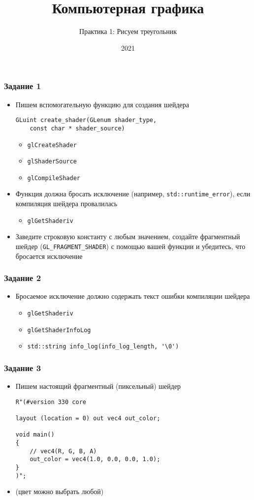 \documentclass{beamer}
\title{Компьютерная графика}
\subtitle{Практика 1: Рисуем треугольник}
\date{2021}
\begin{document}
\frame{\titlepage}

\begin{frame}[fragile]
\frametitle{Задание 1}
\begin{itemize}
\item Пишем вспомогательную функцию для создания шейдера
\begin{verbatim}
GLuint create_shader(GLenum shader_type,
    const char * shader_source)
\end{verbatim}
\pause
\begin{itemize}
\item \verb|glCreateShader|
\item \verb|glShaderSource|
\item \verb|glCompileShader|
\end{itemize}
\pause
\item Функция должна бросать исключение (например, \verb|std::runtime_error|), если компиляция шейдера провалилась
\begin{itemize}
\item \verb|glGetShaderiv|
\end{itemize}
\pause
\item Заведите строковую константу с любым значением, создайте фрагментный шейдер (\verb|GL_FRAGMENT_SHADER|) с помощью вашей функции и убедитесь, что бросается исключение
\end{itemize}
\end{frame}

\begin{frame}[fragile]
\frametitle{Задание 2}
\begin{itemize}
\item Бросаемое исключение должно содержать текст ошибки компиляции шейдера
\pause
\begin{itemize}
\item \verb|glGetShaderiv|
\item \verb|glGetShaderInfoLog|
\item \verb|std::string info_log(info_log_length, '\0')|
\end{itemize}
\end{itemize}
\end{frame}

\begin{frame}[fragile]
\frametitle{Задание 3}
\begin{itemize}
\item Пишем настоящий фрагментный (пиксельный) шейдер
\pause
\begin{verbatim}
R"(#version 330 core

layout (location = 0) out vec4 out_color;

void main()
{
    // vec4(R, G, B, A)
    out_color = vec4(1.0, 0.0, 0.0, 1.0);
}
)";
\end{verbatim}
\pause
\item (цвет можно выбрать любой)
\end{itemize}
\end{frame}
\end{document}

